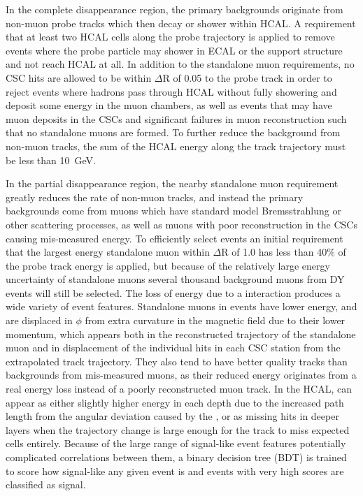 In the complete disappearance region, the primary backgrounds originate from non-muon probe tracks which then decay or shower within HCAL. 
A requirement that at least two HCAL cells along the probe trajectory is applied to remove events where the probe particle may shower in ECAL or the support structure and not reach HCAL at all.
In addition to the standalone muon requirements, no CSC hits are allowed to be within $\Delta$R of 0.05 to the probe track in order to reject events where hadrons pass through HCAL without fully showering and deposit some energy in the muon chambers, as well as events that may have muon deposits in the CSCs and significant failures in muon reconstruction such that no standalone muons are formed.
To further reduce the background from non-muon tracks, the sum of the HCAL energy along the track trajectory must be less than \SI{10}{\giga\eV}. 

In the partial disappearance region, the nearby standalone muon requirement greatly reduces the rate of non-muon tracks, and instead the primary backgrounds come from muons which have standard model Bremsstrahlung or other scattering processes, as well as muons with poor reconstruction in the CSCs causing mis-measured energy.
To efficiently select events an initial requirement that the largest energy standalone muon within $\Delta$R of 1.0 has less than 40$\%$ of the probe track energy is applied, but because of the relatively large energy uncertainty of standalone muons several thousand background muons from DY events will still be selected.
The loss of energy due to a \dbrem interaction produces a wide variety of event features.
Standalone muons in \dbrem events have lower energy, and are displaced in $\phi$ from extra curvature in the magnetic field due to their lower momentum, which appears both in the reconstructed trajectory of the standalone muon and in displacement of the individual hits in each CSC station from the extrapolated track trajectory.
They also tend to have better quality tracks than backgrounds from mis-measured muons, as their reduced energy originates from a real energy loss instead of a poorly reconstructed muon track.
In the HCAL, \dbrem can appear as either slightly higher energy in each depth due to the increased path length from the angular deviation caused by the \dbrem, or as missing hits in deeper layers when the trajectory change is large enough for the track to miss expected cells entirely.
Because of the large range of signal-like event features potentially complicated correlations between them, a binary decision tree (BDT) is trained to score how signal-like any given event is and events with very high scores are classified as signal.

